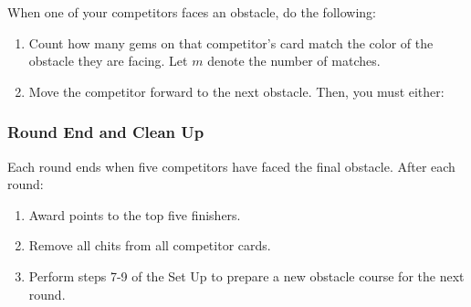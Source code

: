 \documentclass[a6paper, 11pt, parskip=half, DIV=15]{scrartcl}
\begin{document}
When one of your competitors faces an obstacle, do the following:
\begin{enumerate}[leftmargin=*]
\item Count how many gems on that competitor's card match the color of the obstacle they are facing. Let $m$ denote the number of matches.
\item Move the competitor forward to the next obstacle. Then, you must either:
\end{enumerate}

\medskip


\newpage
\subsubsection*{Round End and Clean Up}
Each round ends when five competitors have faced the final obstacle. After each round:
\begin{enumerate}[leftmargin=*]
\item Award points to the top five finishers.
\item Remove all chits from all competitor cards.
\item Perform steps 7-9 of the Set Up to prepare a new obstacle course for the next round.
\end{enumerate}

\smallskip

 
\end{document}
